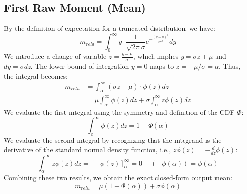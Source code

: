 \documentclass{article}
\theoremstyle{plain}
\theoremstyle{definition}
\theoremstyle{remark}
\begin{document}
\subsection{First Raw Moment (Mean)}
By the definition of expectation for a truncated distribution, we have:
\begin{equation}
    m_{relu} = \int_{0}^{\infty} y \cdot \frac{1}{\sqrt{2\pi}\sigma} e^{-\frac{(y-\mu)^2}{2\sigma^2}} dy
\end{equation}
We introduce a change of variable $z = \frac{y-\mu}{\sigma}$, which implies $y = \sigma z + \mu$ and $dy = \sigma dz$. The lower bound of integration $y=0$ maps to $z = -\mu/\sigma = \alpha$. Thus, the integral becomes:
\begin{align}
    m_{relu} &= \int_{\alpha}^{\infty} (\sigma z + \mu) \cdot \phi(z) dz \nonumber \\
    &= \mu \int_{\alpha}^{\infty} \phi(z) dz + \sigma \int_{\alpha}^{\infty} z \phi(z) dz
\end{align}
We evaluate the first integral using the symmetry and definition of the CDF $\Phi$:
\begin{equation}
    \int_{\alpha}^{\infty} \phi(z) dz = 1 - \Phi(\alpha)
\end{equation}
We evaluate the second integral by recognizing that the integrand is the derivative of the standard normal density function, i.e., $z \phi(z) = -\frac{d}{dz} \phi(z)$:
\begin{equation}
    \int_{\alpha}^{\infty} z \phi(z) dz = \left[ -\phi(z) \right]_{\alpha}^{\infty} = 0 - (-\phi(\alpha)) = \phi(\alpha)
\end{equation}
Combining these two results, we obtain the exact closed-form output mean:
\begin{equation}
    m_{relu} = \mu (1 - \Phi(\alpha)) + \sigma \phi(\alpha)
\end{equation}
\end{document}
